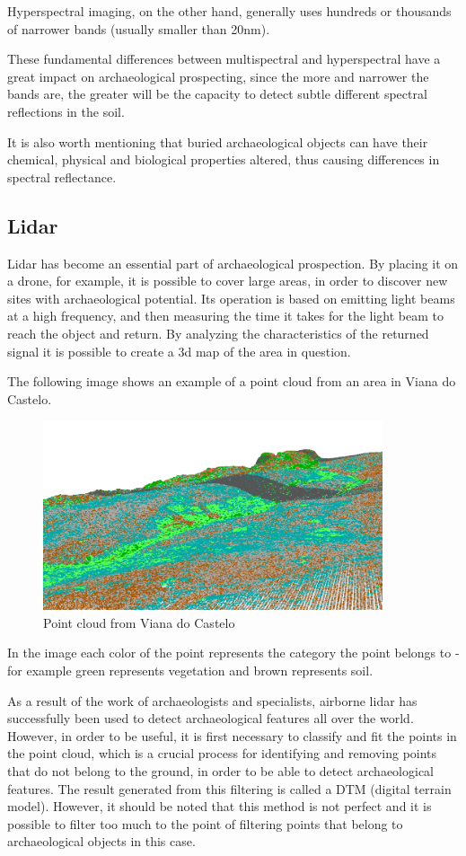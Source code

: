 Hyperspectral imaging, on the other hand, generally uses hundreds or thousands of narrower bands (usually smaller than 20nm).

These fundamental differences between multispectral and hyperspectral have a great impact on archaeological prospecting, since the more and narrower the bands are, the greater will be the capacity to detect subtle different spectral reflections in the soil.

It is also worth mentioning that buried archaeological objects can have their chemical, physical and biological properties altered, thus causing differences in spectral reflectance.


\subsection{Lidar}
Lidar has become an essential part of archaeological prospection. By placing it on a drone, for example, it is possible to cover large areas, in order to discover new sites with archaeological potential.  Its operation is based on emitting light beams at a high frequency, and then measuring the time it takes for the light beam to reach the object and return.
By analyzing the characteristics of the returned signal it is possible to create a 3d map of the area in question.

The following image shows an example of a point cloud from an area in Viana do Castelo.

\begin{figure}[H]
\centering
\includegraphics[width=10cm]{images/pointcloudViana.png}
\caption{Point cloud from Viana do Castelo}
\end{figure}

In the image each color of the point represents the category the point belongs to - for example green represents vegetation and brown represents soil.

As a result of the work of archaeologists and specialists, airborne lidar has successfully been used to detect archaeological features all over the world. However, in order to be useful, it is first necessary to classify and fit the points in the point cloud, which is a crucial process for identifying and removing points that do not belong to the ground, in order to be able to detect archaeological features. The result generated from this filtering is called a DTM (digital terrain model). However, it should be noted that this method is not perfect and it is possible to filter too much to the point of filtering points that belong to archaeological objects in this case.

